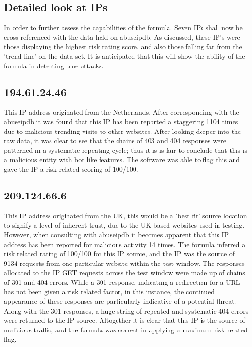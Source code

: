 \subsection{Detailed look at IPs }
In order to further assess the capabilities of the formula. Seven IPs shall now be cross referenced with the data held on abuseipdb. As discussed, these IP's were those displaying the highest risk rating score, and also those falling far from the 'trend-line' on the data set. It is anticipated that this will show the ability of the formula in detecting true attacks.

\subsection*{194.61.24.46}

This IP address originated from the Netherlands. After corresponding with the abuseipdb it was found that this IP has been reported a staggering 1104 times due to malicious trending visits to other websites. After looking deeper into the raw data, it was clear to see that the chains of 403 and 404 responses were patterned in a systematic repeating cycle; thus it is is fair to conclude that this is a malicious entity with bot like features. The software was able to flag this and gave the IP a risk related scoring of 100/100.  

\subsection*{209.124.66.6}

This IP address originated from the UK, this would be a 'best fit' source location to signify a level of inherent trust, due to the UK based websites used in testing. However, when consulting with abuseipdb it becomes apparent that this IP address has been reported for malicious activity 14 times. The formula inferred a risk related rating of 100/100 for this IP source, and the IP was the source of 9134 requests from one particular website within the test window. The responses allocated to the IP GET requests across the test window were made up of chains of 301 and 404 errors. While a 301 response, indicating a redirection for a URL has not been given a risk related factor, in this instance, the continued appearance of these responses are particularly indicative of a potential threat. Along with the 301 responses, a huge string of repeated and systematic 404 errors were returned to the IP source. Altogether it is clear that this IP is the source of malicious traffic, and the formula was correct in applying a maximum risk related flag.

